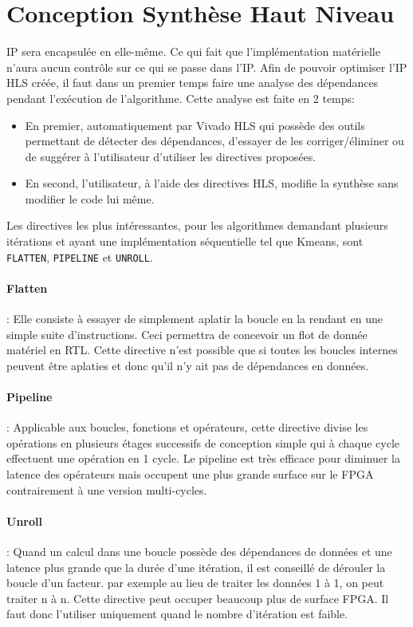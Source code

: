 \documentclass[12pt,a4paper]{article}
\begin{document}
\section{Conception Synthèse Haut Niveau}
IP sera encapsulée en elle-même. Ce qui fait que l'implémentation matérielle n'aura aucun contrôle sur ce qui se passe dans l'IP.
Afin de pouvoir optimiser l'IP HLS créée, il faut dans un premier temps faire une analyse des dépendances pendant l'exécution de l'algorithme. Cette analyse est faite en 2 temps: 
\begin{itemize}
\item En premier, automatiquement par Vivado HLS qui possède des outils permettant de détecter des dépendances, d'essayer de les corriger/éliminer ou de suggérer à l'utilisateur d'utiliser les directives proposées.
\item En second, l'utilisateur, à l'aide des directives HLS, modifie la synthèse sans modifier le code lui même.
\end{itemize}
 Les directives les plus intéressantes, pour les algorithmes demandant plusieurs itérations et ayant une implémentation séquentielle tel que Kmeans, sont \texttt{FLATTEN}, \texttt{PIPELINE} et \texttt{UNROLL}.
 
\paragraph{Flatten} : Elle consiste à essayer de simplement aplatir la boucle en la rendant en une simple suite d'instructions. Ceci permettra de concevoir un flot de donnée matériel en RTL. Cette directive n'est possible que si toutes les boucles internes peuvent être aplaties et donc qu'il n'y ait pas de dépendances en données.
\paragraph{Pipeline} : Applicable aux boucles, fonctions et opérateurs, cette directive divise les opérations en plusieurs étages successifs de conception simple qui à chaque cycle effectuent une opération en 1 cycle. Le pipeline est très efficace pour diminuer la latence des opérateurs mais occupent une plus grande surface sur le FPGA contrairement à une version multi-cycles.

\paragraph{Unroll} : Quand un calcul dans une boucle possède des dépendances de données et une latence plus grande que la durée d'une itération, il est conseillé de dérouler la boucle d'un facteur. par exemple au lieu de traiter les données 1 à 1, on peut traiter n à n. Cette directive peut occuper beaucoup plus de surface FPGA. Il faut donc l'utiliser uniquement quand le nombre d'itération est faible.
\end{document}
